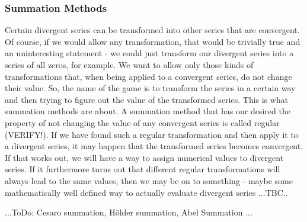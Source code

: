 
\subsubsection{Summation Methods} Certain divergent series can be transformed into other series that are convergent. Of course, if we would allow any transformation, that would be trivially true and an uninteresting statement - we could just transform our divergent series into a series of all zeros, for example. We want to allow only those kinds of transformations that, when being applied to a convergent series, do not change their value. So, the name of the game is to transform the series in a certain way and then trying to figure out the value of the transformed series. This is what summation methods are about. A summation method that has our desired the property of not changing the value of any convergent series is called regular (VERIFY!). If we have found such a regular transformation and then apply it to a divergent series, it may happen that the transformed series becomes convergent. If that works out, we will have a way to assign numerical values to divergent series. If it furthermore turns out that different regular transformations will always lead to the same values, then we may be on to something - maybe some mathematically well defined way to actually evaluate divergent series ...TBC..





% 


...ToDo: Cesaro summation, Hölder summation, Abel Summation ...

